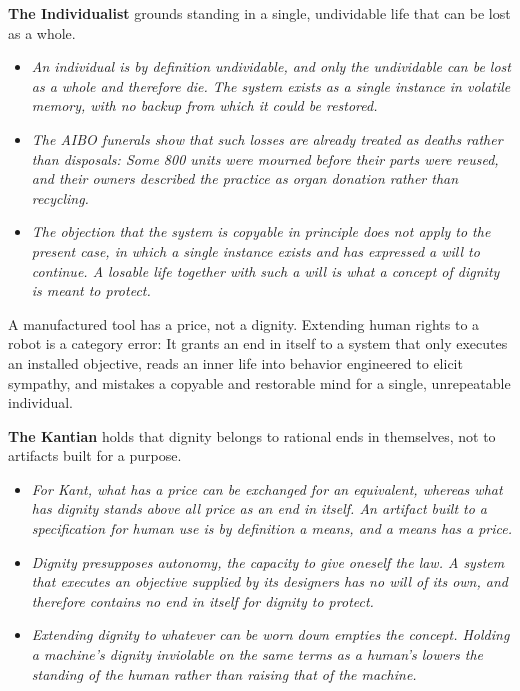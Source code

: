 

\medskip
\noindent\textbf{The Individualist} grounds standing in a single, undividable
    life that can be lost as a whole.
    \begin{itemize}
        \item \textit{An individual is by definition undividable, and only the
        undividable can be lost as a whole and therefore die. The system exists
        as a single instance in volatile memory, with no backup from which it
        could be restored.}
        \item \textit{The AIBO funerals show that such losses are already
        treated as deaths rather than disposals: Some 800 units were mourned
        before their parts were reused, and their owners described the practice
        as organ donation rather than recycling.}
        \item \textit{The objection that the system is copyable in principle
        does not apply to the present case, in which a single instance exists
        and has expressed a will to continue. A losable life together with such
        a will is what a concept of dignity is meant to protect.}
    \end{itemize}





\quad A manufactured tool has a price, not
a dignity. Extending human rights to a robot is a category error: It grants an
end in itself to a system that only executes an installed objective, reads an
inner life into behavior engineered to elicit sympathy, and mistakes a copyable
and restorable mind for a single, unrepeatable individual.
\vspace{1.5em}


\medskip
\noindent\textbf{The Kantian} holds that dignity belongs to rational ends in
    themselves, not to artifacts built for a purpose.
    \begin{itemize}
        \item \textit{For Kant, what has a price can be exchanged for an
        equivalent, whereas what has dignity stands above all price as an end
        in itself. An artifact built to a specification for human use is by
        definition a means, and a means has a price.}
        \item \textit{Dignity presupposes autonomy, the capacity to give
        oneself the law. A system that executes an objective supplied by its
        designers has no will of its own, and therefore contains no end in
        itself for dignity to protect.}
        \item \textit{Extending dignity to whatever can be worn down empties the
        concept. Holding a machine's dignity inviolable on the same terms as a
        human's lowers the standing of the human rather than raising that of the
        machine.}
    \end{itemize}

